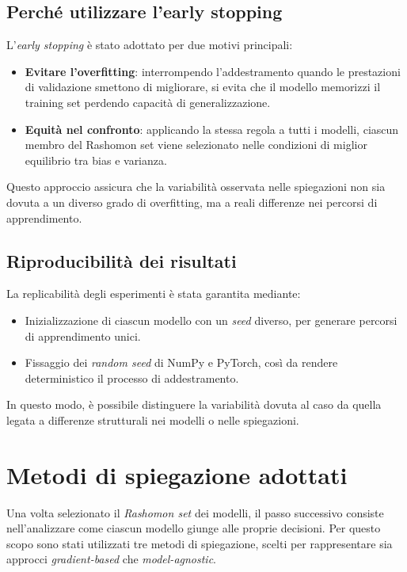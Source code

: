 \documentclass{article}
\begin{document}
\subsection{Perché utilizzare l’early stopping}
L’\emph{early stopping} è stato adottato per due motivi principali:
\begin{itemize}
      \item \textbf{Evitare l’overfitting}: interrompendo l’addestramento quando le prestazioni di validazione smettono di migliorare, si evita che il modello memorizzi il training set perdendo capacità di generalizzazione.
      \item \textbf{Equità nel confronto}: applicando la stessa regola a tutti i modelli, ciascun membro del Rashomon set viene selezionato nelle condizioni di miglior equilibrio tra bias e varianza.
\end{itemize}

Questo approccio assicura che la variabilità osservata nelle spiegazioni non
sia dovuta a un diverso grado di overfitting, ma a reali differenze nei
percorsi di apprendimento.

\subsection{Riproducibilità dei risultati}
La replicabilità degli esperimenti è stata garantita mediante:
\begin{itemize}
      \item Inizializzazione di ciascun modello con un \emph{seed} diverso, per generare
            percorsi di apprendimento unici.
      \item Fissaggio dei \emph{random seed} di NumPy e PyTorch, così da rendere
            deterministico il processo di addestramento.
\end{itemize}

In questo modo, è possibile distinguere la variabilità dovuta al caso da quella
legata a differenze strutturali nei modelli o nelle spiegazioni.

\section{Metodi di spiegazione adottati}

Una volta selezionato il \emph{Rashomon set} dei modelli, il passo successivo
consiste nell’analizzare come ciascun modello giunge alle proprie decisioni.
Per questo scopo sono stati utilizzati tre metodi di spiegazione, scelti per
rappresentare sia approcci \emph{gradient-based} che \emph{model-agnostic}.
\end{document}
